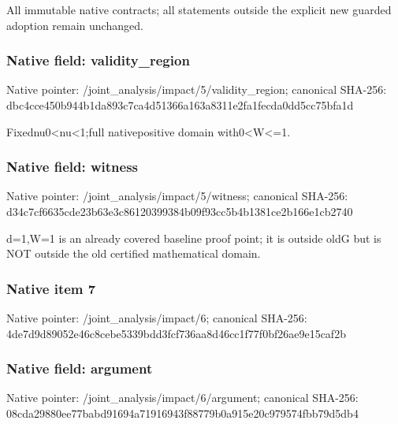\documentclass[10pt,a4paper]{article}
\begin{document}
\begingroup\raggedright\sloppy All immutable native contracts;\allowbreak{} all statements outside the explicit new guarded adoption remain unchanged.\par\endgroup

\subsubsection{Native field: validity\_\allowbreak{}region}
Native pointer: /joint\_\allowbreak{}analysis/impact/5/validity\_\allowbreak{}region; canonical SHA-256: dbc4cce450b944b1da893c7ca4d51366a163a8311e2fa1fecda0dd5cc75bfa1d

\begingroup\raggedright\sloppy Fixednu0<nu<1;\allowbreak{}full nativepositive domain with0<W<=\allowbreak{}1.\par\endgroup

\subsubsection{Native field: witness}
Native pointer: /joint\_\allowbreak{}analysis/impact/5/witness; canonical SHA-256: d34c7cf6635cde23b63e3c86120399384b09f93cc5b4b1381ce2b166e1cb2740

\begingroup\raggedright\sloppy d=\allowbreak{}1,\allowbreak{}W=\allowbreak{}1 is an already covered baseline proof point;\allowbreak{} it is outside oldG but is NOT outside the old certified mathematical domain.\par\endgroup

\subsubsection{Native item 7}
Native pointer: /joint\_\allowbreak{}analysis/impact/6; canonical SHA-256: 4de7d9d89052e46c8cebe5339bdd3fcf736aa8d46cc1f77f0bf26ae9e15caf2b

\subsubsection{Native field: argument}
Native pointer: /joint\_\allowbreak{}analysis/impact/6/argument; canonical SHA-256: 08cda29880ee77babd91694a71916943f88779b0a915e20c979574fbb79d5db4
\end{document}
